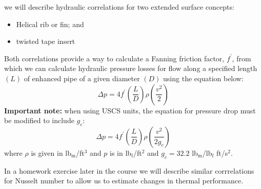  we will describe hydraulic correlations for two extended surface concepts:  

\begin{itemize}
\item Helical rib or fin; and
\item twisted tape insert
\end{itemize} 
Both correlations provide a way to calculate a Fanning friction factor, $f^{\prime}$, from which we can calculate hydraulic pressure losses for flow along a specified length $(L)$ of enhanced pipe of a given diameter $(D)$ using the equation below:
$$\Delta p = 4 f^{\prime} \left(\frac{L}{D} \right)\rho \left(\frac{v^2}{2} \right)$$
\textbf{Important note:} when using USCS units, the equation for pressure drop must be modified to include $g_c$:
$$\Delta p = 4 f^{\prime} \left(\frac{L}{D} \right)\rho \left(\frac{v^2}{2g_c} \right)$$
where $\rho$ is given in lb$_{\text{m}}$/ft$^{3}$ and $p$ is in lb$_{\text{f}}$/ft$^{2}$ and $g_c = 32.2$ lb$_{\text{m}}$/lb$_{\text{f}}$ ft/s$^{2}$. 

In a homework exercise later in the course we will describe similar corrrelations for Nusselt number to allow us to estimate changes in thermal performance.

